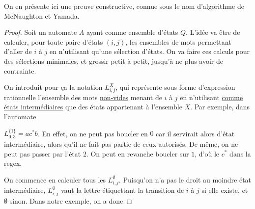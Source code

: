On en présente ici une preuve constructive, connue sous le nom d'algorithme de McNaughton et Yamada.

\begin{proof}
Soit un automate $A$ ayant comme ensemble d'états $Q$. L'idée va être de calculer, pour toute paire d'états $(i,j)$, les ensembles de mots permettant d'aller de $i$ à $j$ en n'utilisant qu'une sélection d'états. On va faire ces calculs pour des sélections minimales, et grossir petit à petit, jusqu'à ne plus avoir de contrainte. 


On introduit pour ça la notation $L_{i,j}^X$, qui représente sous forme d'expression rationnelle l'ensemble des mots \underline{non-vides} menant de $i$ à $j$ en n'utilisant \underline{comme états intermédiaires} que des états appartenant à l'ensemble $X$. Par exemple, dans l'automate  

\begin{figure}[H]
\centering
{}
\end{figure}

$L_{0,3}^{\{1\}} = ac^*b$. En effet, on ne peut pas boucler en $0$ car il servirait alors d'état intermédiaire, alors qu'il ne fait pas partie de ceux autorisés. De même, on ne peut pas passer par l'état $2$. On peut en revanche boucler sur $1$, d'où le $c^*$ dans la regex.

On commence en calculer tous les $L_{i,j}^{\emptyset}$. Puisqu'on n'a pas le droit au moindre état intermédiaire, $L_{i,j}^{\emptyset}$ vaut la lettre étiquettant la transition de $i$ à $j$ si elle existe, et $\emptyset$ sinon. Dans notre exemple, on a donc 


\end{proof}
